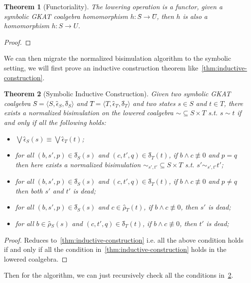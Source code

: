 \documentclass[conference]{IEEEtran}
\newtheorem{theorem}{Theorem}
\begin{document}
\begin{theorem}[Functoriality]
    The lowering operation is a functor, given a symbolic GKAT coalgebra homomorphism \(h: Ŝ → Û\), then \(h\) is also a homomorphism \(h: S → U\).
\end{theorem}

\begin{proof}
    
\end{proof}

We can then migrate the normalized bisimulation algorithm to the symbolic setting, we will first prove an inductive construction theorem like~\cref{thm:inductive-construction}.

\begin{theorem}[Symbolic Inductive Construction]\label{thm:symb-inductive-construction}
    Given two symbolic GKAT coalgebra \(Ŝ = ⟨S, ϵ̂_S, δ̂_S⟩\) and \(T̂ = ⟨T, ϵ̂_T, δ̂_T⟩\) and two states \(s ∈ S\) and \(t ∈ T\), there exists a normalized bisimulation on the lowered coalgebra \({∼} ⊆ S × T\) s.t. \(s ∼ t\) if and only if all the following holds:
    \begin{itemize}
        \item \(⋁ ϵ̂_S(s) ≡ ⋁ ϵ̂_T(t)\);
        \item for all \((b, s', p) ∈ δ̂_S(s)\) and \((c, t', q) ∈ δ̂_T(t)\), if \(b ∧ c ≢ 0\) and \(p = q\) then here exists a normalized bisimulation \({∼_{s',t'}} ⊆ S × T\) s.t. \(s' ∼_{s',t'} t'\);
        \item for all \((b, s', p) ∈ δ̂_S(s)\) and \((c, t', q) ∈ δ̂_T(t)\), if \(b ∧ c ≢ 0\) and \(p ≠ q\) then both \(s'\) and \(t'\) is dead;  
        \item for all \((b, s', p) ∈ δ̂_S(s)\) and \(c ∈ ρ̂_T(t)\), if \(b ∧ c ≢ 0\), then \(s'\) is dead;
        \item for all \(b ∈ ρ̂_S(s)\) and \((c, t', q) ∈ δ̂_T(t)\), if \(b ∧ c ≢ 0\), then \(t'\) is dead;
    \end{itemize}
\end{theorem}

\begin{proof}
    Reduces to~\cref{thm:inductive-construction} i.e. all the above condition holds if and only if all the condition in~\cref{thm:inductive-construction} holds in the lowered coalgebra.
\end{proof}

Then for the algorithm, we can just recursively check all the conditions in~\cref{thm:symb-inductive-construction}.
\end{document}

